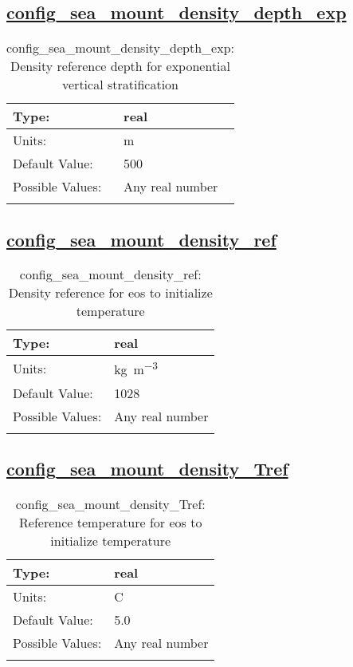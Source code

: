 \subsection[config\_sea\_mount\_density\_depth\_exp]{\hyperref[sec:nm_tab_sea_mount]{config\_sea\_mount\_density\_depth\_exp}}
\label{subsec:nm_sec_config_sea_mount_density_depth_exp}
\begin{center}
\begin{longtable}{| p{2.0in} || p{4.0in} |}
    \hline
    Type: & real \\
    \hline
    Units: & \si{m} \\
    \hline
    Default Value: & 500 \\
    \hline
    Possible Values: & Any real number \\
    \hline
    \caption{config\_sea\_mount\_density\_depth\_exp: Density reference depth for exponential vertical stratification}
\end{longtable}
\end{center}
\subsection[config\_sea\_mount\_density\_ref]{\hyperref[sec:nm_tab_sea_mount]{config\_sea\_mount\_density\_ref}}
\label{subsec:nm_sec_config_sea_mount_density_ref}
\begin{center}
\begin{longtable}{| p{2.0in} || p{4.0in} |}
    \hline
    Type: & real \\
    \hline
    Units: & \si{kg.m^{-3}} \\
    \hline
    Default Value: & 1028 \\
    \hline
    Possible Values: & Any real number \\
    \hline
    \caption{config\_sea\_mount\_density\_ref: Density reference for eos to initialize temperature}
\end{longtable}
\end{center}
\subsection[config\_sea\_mount\_density\_Tref]{\hyperref[sec:nm_tab_sea_mount]{config\_sea\_mount\_density\_Tref}}
\label{subsec:nm_sec_config_sea_mount_density_Tref}
\begin{center}
\begin{longtable}{| p{2.0in} || p{4.0in} |}
    \hline
    Type: & real \\
    \hline
    Units: & \si{C} \\
    \hline
    Default Value: & 5.0 \\
    \hline
    Possible Values: & Any real number \\
    \hline
    \caption{config\_sea\_mount\_density\_Tref: Reference temperature for eos to initialize temperature}
\end{longtable}
\end{center}
